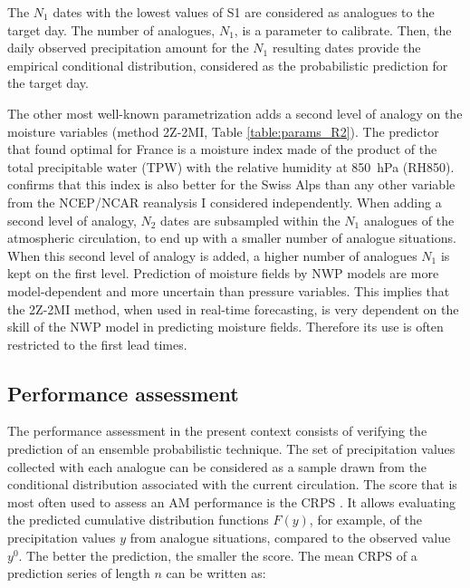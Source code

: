 \documentclass[review]{elsarticle}
\begin{document}
The $N_{1}$ dates with the lowest values of S1 are considered as analogues to the target day. The number of analogues, $N_{1}$, is a parameter to calibrate. Then, the daily observed precipitation amount for the $N_{1}$ resulting dates provide the empirical conditional distribution, considered as the probabilistic prediction for the target day.

The other most well-known parametrization adds a second level of analogy on the moisture variables (method 2Z-2MI, Table \ref{table:params_R2}). The predictor that \citet{Bontron2004} found optimal for France is a moisture index made of the product of the total precipitable water (TPW) with the relative humidity at 850~hPa (RH850). \cite{Horton2012a} confirms that this index is also better for the Swiss Alps than any other variable from the NCEP/NCAR reanalysis I considered independently. When adding a second level of analogy, $N_{2}$ dates are subsampled within the $N_{1}$ analogues of the atmospheric circulation, to end up with a smaller number of analogue situations. When this second level of analogy is added, a higher number of analogues $N_{1}$ is kept on the first level. Prediction of moisture fields by NWP models are more model-dependent and more uncertain than pressure variables. This implies that the 2Z-2MI method, when used in real-time forecasting, is very dependent on the skill of the NWP model in predicting moisture fields. Therefore its use is often restricted to the first lead times.


\subsection{Performance assessment}
\label{sec:score}

The performance assessment in the present context consists of verifying the prediction of an ensemble probabilistic technique. The set of precipitation values collected with each analogue can be considered as a sample drawn from the conditional distribution associated with the current circulation. The score that is most often used to assess an AM performance is the CRPS \citep[Continuous Ranked Probability Score,][]{Brown1974, Matheson1976, Hersbach2000}. It allows evaluating the predicted cumulative distribution functions $F(y)$, for example, of the precipitation values $y$ from analogue situations, compared to the observed value $y^{0}$. The better the prediction, the smaller the score. The mean CRPS of a prediction series of length $n$ can be written as:
\end{document}
